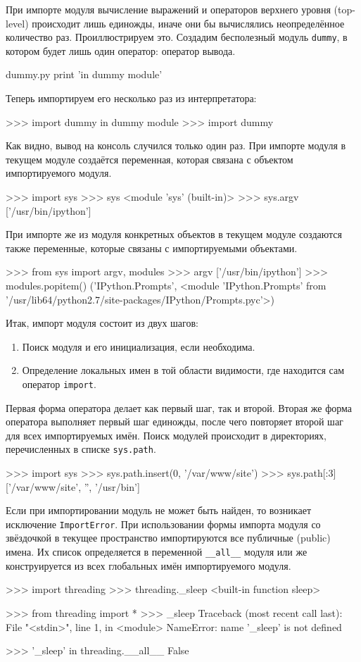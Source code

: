 При импорте модуля вычисление выражений и операторов верхнего уровня (top-level) происходит лишь единожды, иначе они бы вычислялись неопределённое количество раз. Проиллюстрируем это. Создадим бесполезный модуль \lstinline{dummy}, в котором будет лишь один оператор: оператор вывода.
\begin{pylst}{dummy.py}{}
print 'in dummy module'
\end{pylst}

Теперь импортируем его несколько раз из интерпретатора:
\begin{pylst}{}{}
>>> import dummy
in dummy module
>>> import dummy
\end{pylst}

Как видно, вывод на консоль случился только один раз. При импорте модуля в текущем модуле создаётся переменная, которая связана с объектом импортируемого модуля.
\begin{pylst}{}{}
>>> import sys
>>> sys
<module 'sys' (built-in)>
>>> sys.argv
['/usr/bin/ipython']
\end{pylst}

При импорте же из модуля конкретных объектов в текущем модуле создаются также переменные, которые связаны с импортируемыми объектами.
\begin{pylst}{}{}
>>> from sys import argv, modules
>>> argv
['/usr/bin/ipython']
>>> modules.popitem()
('IPython.Prompts',
 <module 'IPython.Prompts' from '/usr/lib64/python2.7/site-packages/IPython/Prompts.pyc'>)
\end{pylst}

Итак, импорт модуля состоит из двух шагов:
\begin{enumerate}
  \item Поиск модуля и его инициализация, если необходима.
  \item Определение локальных имен в той области видимости, где находится сам оператор \lstinline{import}.
\end{enumerate}
Первая форма оператора делает как первый шаг, так и второй. Вторая же форма оператора выполняет первый шаг единожды, после чего повторяет второй шаг для всех импортируемых имён. Поиск модулей происходит в директориях, перечисленных в списке \lstinline{sys.path}.
\begin{pylst}{}{}
>>> import sys
>>> sys.path.insert(0, '/var/www/site')
>>> sys.path[:3]
['/var/www/site', '', '/usr/bin']
\end{pylst}

Если при импортировании модуль не может быть найден, то возникает исключение \lstinline{ImportError}. При использовании формы импорта модуля со звёздочкой в текущее пространство импортируются все публичные (public) имена. Их список определяется в переменной \lstinline{__all__} модуля или же конструируется из всех глобальных имён импортируемого модуля.
\begin{pylst}{}{}
>>> import threading
>>> threading._sleep
<built-in function sleep>

>>> from threading import *
>>> _sleep
Traceback (most recent call last):
  File "<stdin>", line 1, in <module>
NameError: name '_sleep' is not defined

>>> '_sleep' in threading.__all__
False
\end{pylst}

